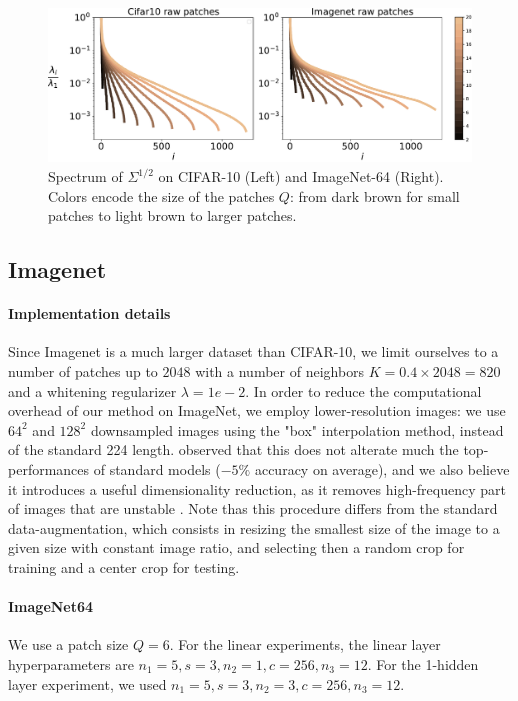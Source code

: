 \documentclass{article}
\begin{document}
{\begin{figure}
  \includegraphics[width=1.\linewidth]{figures/spectrum_patches}
  \caption{Spectrum of $\Sigma^{1/2}$ on CIFAR-10 (Left) and ImageNet-64 (Right).\label{spectrum} Colors encode the size of the patches $Q$: from dark brown for small patches to light brown to larger patches.}
\end{figure}
\subsection{Imagenet}

\paragraph{Implementation details}  Since Imagenet is a much larger dataset than CIFAR-10, we limit ourselves to a number of patches up to $2048$ with a number of neighbors $K=0.4\times 2048 = 820$ and a whitening regularizer $\lambda=1e-2$.
In order to reduce the computational overhead of our method on ImageNet, we employ lower-resolution images: we use $64^2$ and $128^2$ downsampled images using the "box" interpolation method, instead of the standard 224 length.  \cite{DBLP:journals/corr/ChrabaszczLH17} observed that this does not alterate much the top-performances of standard models ($-5 \%$ accuracy on average), and we also believe it introduces a useful dimensionality reduction, as it removes high-frequency part of images that are  unstable \citet{chjdq}.
Note thas this procedure differs from the standard data-augmentation, which consists in resizing the smallest size of the image to a given size with constant image ratio, and selecting then a random crop for training and a center crop for testing.

\paragraph{ImageNet64}

We use a patch size $Q=6$.
For the linear experiments, the linear layer hyperparameters are  $n_1=5,s=3, n_2=1, c=256, n_3=12$.
For the 1-hidden layer experiment, we used $n_1=5, s=3, n_2=3,c=256, n_3=12$.


}
\end{document}
